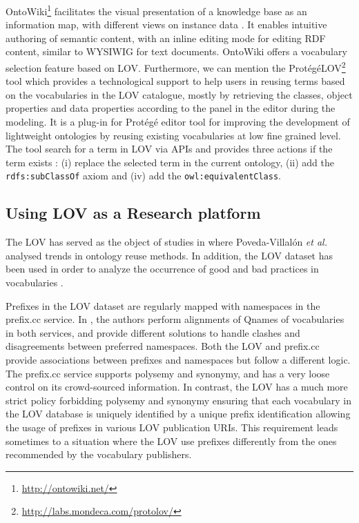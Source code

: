 \documentclass{iosart2c}
\begin{document}
OntoWiki\footnote{\url{http://ontowiki.net/}} facilitates the visual presentation of a knowledge base as an information map, with different views on instance data \cite{auer2006ontowiki}. It enables intuitive authoring of semantic content, with an inline editing mode for editing RDF content, similar to WYSIWIG for text documents. OntoWiki offers a vocabulary selection feature based on LOV.
Furthermore, we can mention the Prot{\'e}g{\'e}LOV\footnote{\url{http://labs.mondeca.com/protolov/}} tool which provides a technological support to help users in reusing terms based on the vocabularies in the LOV catalogue, mostly by retrieving the classes, object properties and data properties according to the panel in the editor during the modeling. It is a plug-in for Prot{\'e}g{\'e} editor tool \cite{prolov2015} for improving the development of lightweight ontologies by reusing existing vocabularies at low fine grained level. The tool search for a term in LOV via APIs and provides three actions if the term exists : (i) replace the selected term in the current ontology, (ii) add the \texttt{rdfs:subClassOf} axiom and (iv) add the \texttt{owl:equivalentClass}.


\subsection{Using LOV as a Research platform}

The LOV has served as the object of studies in \cite{poveda2012landscape} where Poveda-Villal\'on \emph{et al.} analysed trends in ontology reuse methods. In addition, the LOV dataset has been used in order to analyze the occurrence of good and bad practices in vocabularies \cite{poveda2013detecting}.

Prefixes in the LOV dataset are regularly mapped with namespaces in the prefix.cc service. In \cite{wasabi13}, the authors perform alignments of Qnames of vocabularies in both services, and provide different solutions to handle clashes and disagreements between preferred namespaces. Both the LOV and prefix.cc provide associations between prefixes and namespaces but follow a different logic. The prefix.cc service supports polysemy and synonymy, and has a very loose control on its crowd-sourced information. In contrast, the LOV has a much more strict policy forbidding polysemy and synonymy ensuring that each vocabulary in the LOV database is uniquely identified by a unique prefix identification allowing the usage of prefixes in various LOV publication URIs. This requirement leads sometimes to a situation where the LOV use prefixes differently from the ones recommended by the vocabulary publishers.
\end{document}
